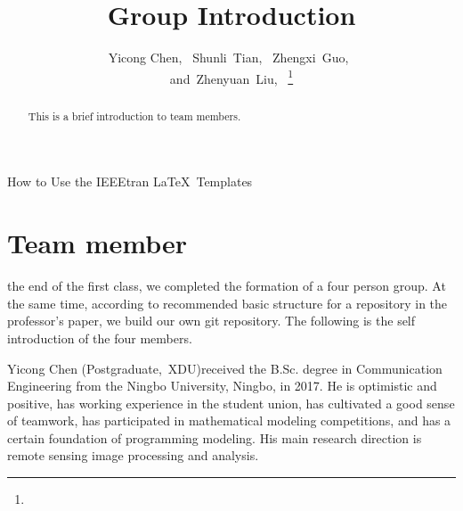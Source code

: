 \documentclass[lettersize,journal]{IEEEtran}
\begin{document}
\title{Group Introduction}

		\author{Yicong Chen,~
		Shunli~Tian,~
		Zhengxi~Guo,~
	
		and~Zhenyuan~Liu,~%
\thanks{ }}

%
{How to Use the IEEEtran \LaTeX \ Templates}

\maketitle

\begin{abstract}
This is a brief introduction to team members.
\end{abstract}



\section{Team member}
 the end of the first class, we completed the formation of a four person group. At the same time, according to recommended basic structure for a repository in the professor's paper, we build our own git repository. The following is the self introduction of the four members. 



\begin{IEEEbiography}{Yicong Chen}
(Postgraduate,~XDU)received the B.Sc. degree in Communication Engineering from the Ningbo University, Ningbo, in 2017. He is optimistic and positive, has working experience in the student union, has cultivated a good sense of teamwork, has participated in mathematical modeling competitions, and has a certain foundation of programming modeling. His main research direction is remote sensing image processing and analysis.\end{IEEEbiography}
\end{document}
